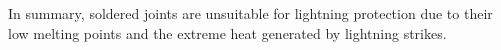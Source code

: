 In summary, soldered joints are unsuitable for lightning protection due to their low melting points and the extreme heat generated by lightning strikes.

